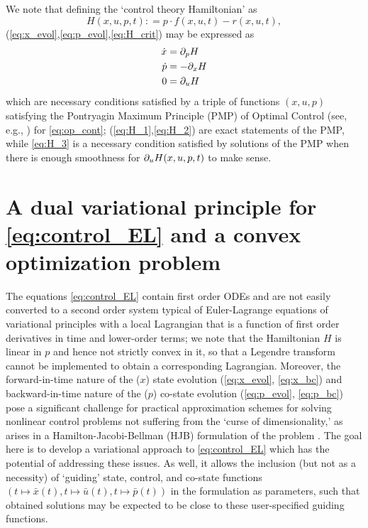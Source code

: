 \documentclass[11pt]{article}
\begin{document}
We note that defining the `control theory Hamiltonian' \cite[Sec.~4.3]{evans1983introduction} as
\[
H(x,u,p,t) : = p  \cdot f(x,u,t) - r(x,u,t),
\]
(\ref{eq:x_evol},\ref{eq:p_evol},\ref{eq:H_crit}) may be expressed as
\begin{subequations}
\allowdisplaybreaks
\begin{align}
     \dot{x} & = \p_p H \label{eq:H_1}\\
    \dot{p}  &= - \p_x H \label{eq:H_2}\\
     0  &= \p_u H \label{eq:H_3}
\end{align}
\end{subequations}
which are necessary conditions satisfied by a triple of functions $(x,u,p)$ satisfying the Pontryagin Maximum Principle (PMP) of Optimal Control (see, e.g., \cite{evans1983introduction}) for \eqref{eq:op_cont}; (\ref{eq:H_1},\ref{eq:H_2}) are exact statements of the PMP, while \eqref{eq:H_3} is a necessary condition satisfied by solutions of the PMP when there is enough smoothness for $\partial_u H (x,u,p,t)$ to make sense.

\section{A dual variational principle for \eqref{eq:control_EL} and a convex optimization problem}\label{sec:dual_vp}
The equations \eqref{eq:control_EL} contain first order ODEs and are not easily converted to a second order system typical of Euler-Lagrange equations of variational principles with a local Lagrangian that is a function of first order derivatives in time and lower-order terms; we note that the Hamiltonian $H$ is linear in $p$ and hence not strictly convex in it, so that a Legendre transform cannot be implemented to obtain a corresponding Lagrangian. Moreover, the forward-in-time nature of the ($x$) state  evolution (\ref{eq:x_evol}, \ref{eq:x_bc}) and backward-in-time nature of the ($p$) co-state evolution (\ref{eq:p_evol}, \ref{eq:p_bc}) pose a significant challenge for practical approximation schemes for solving nonlinear control problems not suffering from the `curse of dimensionality,' as arises in a Hamilton-Jacobi-Bellman (HJB) formulation \cite[Secs.~5.1.2,5.1.3]{evans1983introduction} of the problem \cite{borggaard2020quadratic,krener,navasca2000solution,al1961optimal}. The goal here is to develop a variational approach to \eqref{eq:control_EL} which has the potential of addressing these issues. As well, it allows the inclusion (but not as a necessity) of `guiding' state, control, and co-state functions $(t \mapsto \bar{x}(t), t \mapsto \bar{u}(t), t \mapsto \bar{p}(t))$ in the formulation as parameters, such that obtained solutions may be expected to be close to these user-specified guiding functions.
\end{document}
